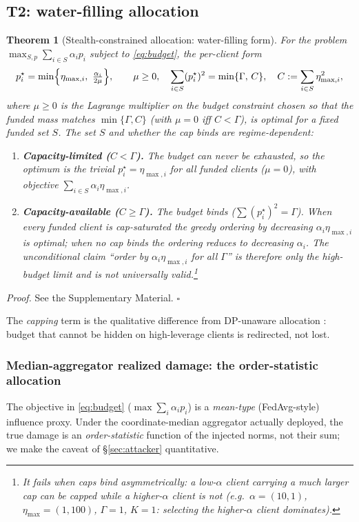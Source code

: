 \documentclass[final,1p,times]{elsarticle}
\newtheorem{theorem}{Theorem}
\begin{document}
\subsection{T2: water-filling allocation}
\begin{theorem}[Stealth-constrained allocation: water-filling form]\label{thm:t2}
For the problem
$\max_{S,p}\sum_{i\in S}\alpha_i p_i$ subject to \eqref{eq:budget}, the
per-client form
\begin{equation}
  p_i^\star=\min\Bigl\{\eta_{\max,i},\ \tfrac{\alpha_i}{2\mu}\Bigr\},
  \qquad \mu\ge 0,\quad
  \sum_{i\in S}(p_i^\star)^2=\min\{\Gamma,\,C\},\quad
  C:=\sum_{i\in S}\eta_{\max,i}^2,
  \label{eq:wf}
\end{equation}
where $\mu\ge 0$ is the Lagrange multiplier on the budget constraint
chosen so that the funded mass matches $\min\{\Gamma,C\}$ (with
$\mu{=}0$ iff $C<\Gamma$), is optimal for a \emph{fixed} funded set $S$. The set $S$ and whether
the cap binds are regime-dependent:
\begin{enumerate}
\item \textbf{Capacity-limited ($C\!<\!\Gamma$).} The budget can never be
  exhausted, so the optimum is the trivial $p_i^\star=\eta_{\max,i}$
  for all funded clients ($\mu{=}0$), with objective
  $\sum_{i\in S}\alpha_i\eta_{\max,i}$.
\item \textbf{Capacity-available ($C\!\ge\!\Gamma$).} The budget binds
  ($\sum(p_i^\star)^2{=}\Gamma$). When every funded client is
  cap-saturated the greedy ordering by decreasing
  $\alpha_i\eta_{\max,i}$ is optimal; when no cap binds the ordering
  reduces to decreasing $\alpha_i$. The unconditional claim ``order by
  $\alpha_i\eta_{\max,i}$ for all $\Gamma$'' is therefore only the
  high-budget limit and is not universally valid.\footnote{It fails
  when caps bind asymmetrically: a low-$\alpha$ client carrying a much
  larger cap can be capped while a higher-$\alpha$ client is not
  (e.g.\ $\alpha{=}(10,1)$, $\eta_{\max}{=}(1,100)$, $\Gamma{=}1$,
  $K{=}1$: selecting the higher-$\alpha$ client dominates).}
\end{enumerate}
\end{theorem}
\emph{Proof.} See the Supplementary Material. \hfill$\square$

The \emph{capping} term is the qualitative difference from
DP-unaware allocation \cite{qiu2025budget}: budget that cannot be
hidden on high-leverage clients is redirected, not lost.

\subsubsection{Median-aggregator realized damage: the order-statistic allocation}
\label{sec:median-alloc}
The objective in \eqref{eq:budget} ($\max\sum_i\alpha_i p_i$) is a
\emph{mean-type} (FedAvg-style) influence proxy. Under the
coordinate-median aggregator actually deployed, the true damage is an
\emph{order-statistic} function of the injected norms, not their sum;
we make the caveat of \S\ref{sec:attacker} quantitative.
\end{document}

